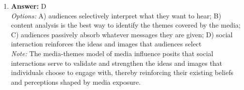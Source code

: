 \documentclass[12pt]{article}
\begin{document}
\begin{enumerate}[label=\arabic*.]
\\ \textit{Note:} The family is the most important agent of socialization in early childhood because it is the primary source of emotional support, values, and norms that shape a child's understanding of the world and their place within it.
\item \textbf{Answer:} D
\\ \textit{Options:} A) audiences selectively interpret what they want to hear; B) content analysis is the best way to identify the themes covered by the media; C) audiences passively absorb whatever messages they are given; D) social interaction reinforces the ideas and images that audiences select
\\ \textit{Note:} The media-themes model of media influence posits that social interactions serve to validate and strengthen the ideas and images that individuals choose to engage with, thereby reinforcing their existing beliefs and perceptions shaped by media exposure.
\end{enumerate}
\end{document}
